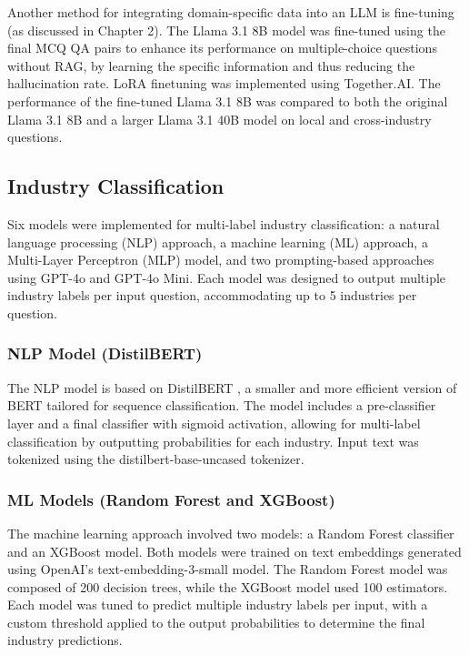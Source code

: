 Another method for integrating domain-specific data into an LLM is fine-tuning (as discussed in Chapter 2). The Llama 3.1 8B model was fine-tuned using the final MCQ QA pairs to enhance its performance on multiple-choice questions without RAG, by learning the specific information and thus reducing the hallucination rate. LoRA finetuning was implemented using Together.AI. The performance of the fine-tuned Llama 3.1 8B was compared to both the original Llama 3.1 8B and a larger Llama 3.1 40B model on local and cross-industry questions. 

 
\subsection{Industry Classification} 
Six models were implemented for multi-label industry classification: a natural language processing (NLP) approach, a machine learning (ML) approach, a Multi-Layer Perceptron (MLP) model, and two prompting-based approaches using GPT-4o and GPT-4o Mini. Each model was designed to output multiple industry labels per input question, accommodating up to 5 industries per question.

\subsubsection{NLP Model (DistilBERT)} 

The NLP model is based on DistilBERT \cite{sanh2020distilbertdistilledversionbert}, a smaller and more efficient version of BERT tailored for sequence classification. The model includes a pre-classifier layer and a final classifier with sigmoid activation, allowing for multi-label classification by outputting probabilities for each industry. Input text was tokenized using the distilbert-base-uncased tokenizer.

\subsubsection{ML Models (Random Forest and XGBoost)} 

The machine learning approach involved two models: a Random Forest classifier and an XGBoost model. Both models were trained on text embeddings generated using OpenAI's text-embedding-3-small model. The Random Forest model was composed of 200 decision trees, while the XGBoost model used 100 estimators. Each model was tuned to predict multiple industry labels per input, with a custom threshold applied to the output probabilities to determine the final industry predictions.

